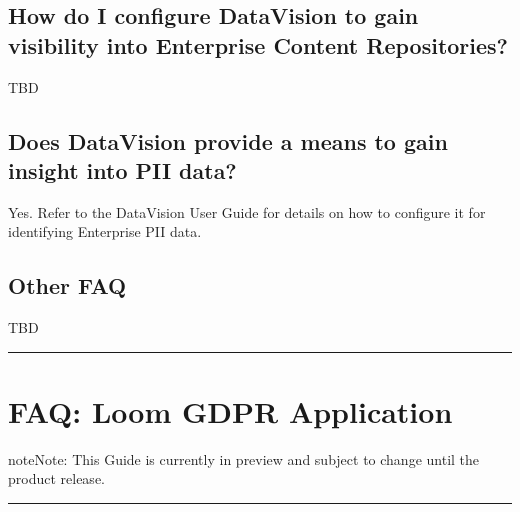 \documentclass[letterpaper,10pt,english]{sphinxmanual}
\begin{document}
\section{How do I configure DataVision to gain visibility into Enterprise Content Repositories?}
\label{\detokenize{loom_trbs_faq:how-do-i-configure-datavision-to-gain-visibility-into-enterprise-content-repositories}}
TBD


\section{Does DataVision provide a means to gain insight into PII data?}
\label{\detokenize{loom_trbs_faq:does-datavision-provide-a-means-to-gain-insight-into-pii-data}}
Yes. Refer to the DataVision User Guide for details on how to configure it for identifying Enterprise PII data.


\section{Other FAQ}
\label{\detokenize{loom_trbs_faq:other-faq}}
TBD


\bigskip\hrule\bigskip



\chapter{FAQ: Loom GDPR Application}
\label{\detokenize{loom_trbs_faq:faq-gdpr-app}}\label{\detokenize{loom_trbs_faq:faq-loom-gdpr-application}}
\begin{sphinxadmonition}{note}{Note:}
This Guide is currently in preview and subject to change until the product release.
\end{sphinxadmonition}


\bigskip\hrule\bigskip
\end{document}
